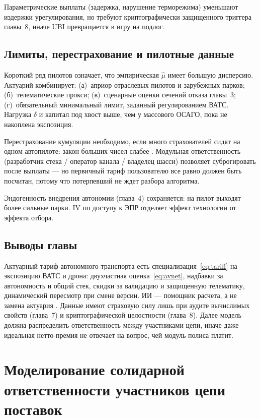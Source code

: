 \documentclass[a4paper,14pt]{extarticle}
\begin{document}
Параметрические выплаты (задержка, нарушение терморежима) уменьшают издержки урегулирования, но требуют криптографически защищенного триггера главы~8, иначе UBI превращается в игру на подлог.

\subsection{Лимиты, перестрахование и пилотные данные}

Короткий ряд пилотов означает, что эмпирическая $\hat\mu$ имеет большую дисперсию. Актуарий комбинирует: (а)~априор отраслевых пилотов и зарубежных парков; (б)~телематические прокси; (в)~сценарные оценки сечений отказа главы~3; (г)~обязательный минимальный лимит, заданный регулированием ВАТС. Нагрузка $\delta$ и капитал под хвост выше, чем у массового ОСАГО, пока не накоплена экспозиция.

Перестрахование кумуляции необходимо, если много страхователей сидят на одном автопилоте: закон больших чисел слабее \cite{shvedov}. Модульная ответственность (разработчик стека / оператор канала / владелец шасси) позволяет суброгировать после выплаты --- но первичный тариф пользователю все равно должен быть посчитан, потому что потерпевший не ждет разбора алгоритма.

Эндогенность внедрения автономии (глава~4) сохраняется: на пилот выходят более сильные парки. IV по доступу к ЭПР \cite{fz169} отделяет эффект технологии от эффекта отбора.

\subsection{Выводы главы}

Актуарный тариф автономного транспорта есть специализация~\eqref{eq:tariff} на экспозицию ВАТС и дрона: двухчастная оценка~\eqref{eq:avnet}, надбавки за автономность и общий стек, скидки за валидацию и защищенную телематику, динамический пересмотр при смене версии. ИИ --- помощник расчета, а не замена актуария \cite{sabitov}. Данные имеют страховую силу лишь при аудите вычислимых свойств (глава~7) и криптографической целостности (глава~8). Далее модель должна распределить ответственность между участниками цепи, иначе даже идеальная нетто-премия не отвечает на вопрос, чей модуль полиса платит.


\section{Моделирование солидарной ответственности участников цепи поставок}
\end{document}
